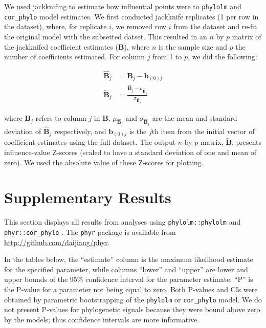 \documentclass[12pt,]{article}
\begin{document}
We used jackknifing to estimate how influential points were to \texttt{phylolm}
and \texttt{cor\_phylo} model estimates.
We first conducted jackknife replicates (1 per row in the dataset), where, for
replicate \(i\), we removed row \(i\) from the dataset and re-fit the original model
with the subsetted datset.
This resulted in an \(n\) by \(p\) matrix of the jackknifed coefficient estimates
(\(\mathbf{B}\)),
where \(n\) is the sample size and \(p\) the number of coefficients estimated.
For column \(j\) from 1 to \(p\), we did the following:

\begin{equation}
\label{eq:jackknife}
\begin{split}
    \mathbf{\hat{B}}_j &= \mathbf{B}_j - \mathbf{b}_{(0)j} \\
    \mathbf{\tilde{B}}_j &= \frac{ \mathbf{\hat{B}}_j - \mu_{\mathbf{\hat{B}}_j} }{ 
        \sigma_{\mathbf{\hat{B}}_j} }
\end{split}
\end{equation}

where \(\mathbf{B}_j\) refers to column \(j\) in \(\mathbf{B}\),
\(\mu_{\mathbf{\hat{B}}_j}\) and \(\sigma_{\mathbf{\hat{B}}_j}\) are the mean and
standard deviation of \(\mathbf{\hat{B}}_j\) respectively,
and \(\mathbf{b}_{(0)j}\) is the \(j\)th item from the initial vector of coefficient
estimates using the full dataset.
The output \(n\) by \(p\) matrix, \(\mathbf{\tilde{B}}\), presents influence-value
Z-scores (scaled to have a standard deviation of one and mean of zero).
We used the absolute value of these Z-scores for plotting.

\hypertarget{supplementary-results}{%
\section{Supplementary Results}\label{supplementary-results}}

This section displays all results from analyses using
\texttt{phylolm::phylolm}
\citep{Ho_2014} and
\texttt{phyr::cor\_phylo}
\citep{Zheng_2009}.
The \texttt{phyr} package is available from \url{http://github.com/daijiang/phyr}.

In the tables below, the ``estimate'' column is the maximum likelihood estimate
for the specified parameter,
while columns ``lower'' and ``upper'' are lower and upper bounds of the 95\% confidence
interval for the parameter estimate.
``P'' is the P-value for a parameter not being equal to zero.
Both P-values and CIs were obtained by parametric bootstrapping of the \texttt{phylolm}
or \texttt{cor\_phylo} model.
We do not present P-values for phylogenetic signals because they were bound
above zero by the models; thus confidence intervals are more informative.
\end{document}

